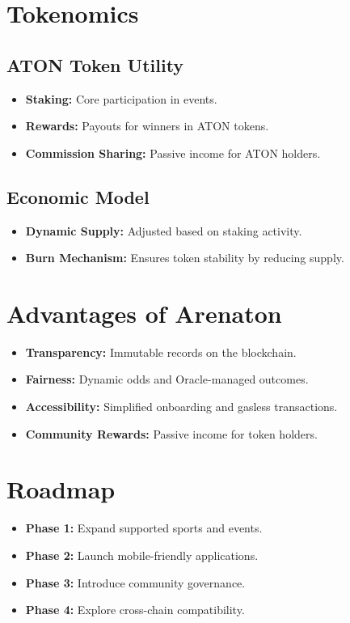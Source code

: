 \documentclass[11pt,twocolumn]{article}
\begin{document}
\section{Tokenomics}
\subsection{ATON Token Utility}
\begin{itemize}[itemsep=0.5em]
    \item \textbf{Staking:} Core participation in events.
    \item \textbf{Rewards:} Payouts for winners in ATON tokens.
    \item \textbf{Commission Sharing:} Passive income for ATON holders.
\end{itemize}

\subsection{Economic Model}
\begin{itemize}[itemsep=0.5em]
    \item \textbf{Dynamic Supply:} Adjusted based on staking activity.
    \item \textbf{Burn Mechanism:} Ensures token stability by reducing supply.
\end{itemize}

\section{Advantages of Arenaton}
\begin{itemize}[itemsep=0.5em]
    \item \textbf{Transparency:} Immutable records on the blockchain.
    \item \textbf{Fairness:} Dynamic odds and Oracle-managed outcomes.
    \item \textbf{Accessibility:} Simplified onboarding and gasless transactions.
    \item \textbf{Community Rewards:} Passive income for token holders.
\end{itemize}

\section{Roadmap}
\begin{itemize}[itemsep=0.5em]
    \item \textbf{Phase 1:} Expand supported sports and events.
    \item \textbf{Phase 2:} Launch mobile-friendly applications.
    \item \textbf{Phase 3:} Introduce community governance.
    \item \textbf{Phase 4:} Explore cross-chain compatibility.
\end{itemize}
\end{document}
